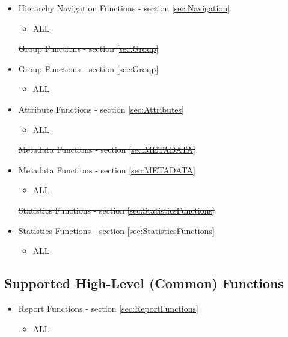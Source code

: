 \documentclass[12pt]{report} %
\providecommand{\DIFdeltex}[1]{{\protect\color{red}\sout{#1}}}                      %
\providecommand{\DIFaddbegin}{} %
\providecommand{\DIFaddend}{} %
\providecommand{\DIFdelbegin}{} %
\providecommand{\DIFdelend}{} %
\providecommand{\DIFdel}[1]{\texorpdfstring{\DIFdeltex{#1}}{}} %
\newcommand{\DIFscaledelfig}{0.5}
\newlength{\DIFdelgraphicswidth} %
\newlength{\DIFdelgraphicsheight} %
\newcommand{\DIFaddincludegraphics}[2][]{{\color{blue}\fbox{\DIFOincludegraphics[#1]{#2}}}} %
\newcommand{\DIFdelincludegraphics}[2][]{%
\sbox{\DIFdelgraphicsbox}{\DIFOincludegraphics[#1]{#2}}%
\settoboxwidth{\DIFdelgraphicswidth}{\DIFdelgraphicsbox} %
\settoboxtotalheight{\DIFdelgraphicsheight}{\DIFdelgraphicsbox} %
\scalebox{\DIFscaledelfig}{%
\parbox[b]{\DIFdelgraphicswidth}{\usebox{\DIFdelgraphicsbox}\\[-\baselineskip] \rule{\DIFdelgraphicswidth}{0em}}\llap{\resizebox{\DIFdelgraphicswidth}{\DIFdelgraphicsheight}{%
\setlength{\unitlength}{\DIFdelgraphicswidth}%
\begin{picture}(1,1)%
\thicklines\linethickness{2pt} %
{\color[rgb]{1,0,0}\put(0,0){\framebox(1,1){}}}%
{\color[rgb]{1,0,0}\put(0,0){\line( 1,1){1}}}%
{\color[rgb]{1,0,0}\put(0,1){\line(1,-1){1}}}%
\end{picture}%
}\hspace*{3pt}}} %
} %
\DeclareRobustCommand{\DIFaddbegin}{\DIFOaddbegin \let\includegraphics\DIFaddincludegraphics} %
\DeclareRobustCommand{\DIFaddend}{\DIFOaddend \let\includegraphics\DIFOincludegraphics} %
\DeclareRobustCommand{\DIFdelbegin}{\DIFOdelbegin \let\includegraphics\DIFdelincludegraphics} %
\DeclareRobustCommand{\DIFdelend}{\DIFOaddend \let\includegraphics\DIFOincludegraphics} %
\begin{document}
\begin{itemize}[noitemsep,nolistsep] 
	\item{Hierarchy Navigation Functions - section \ref{sec:Navigation}}
		\begin{itemize}[noitemsep,nolistsep] 
			\item{ALL}
		\end{itemize}
	\DIFdelbegin %
\DIFdel{Group Functions - section \ref{sec:Group}
	}\DIFdelend \DIFaddbegin \item{Group Functions - section \ref{sec:Group}}
		\DIFaddend \begin{itemize}[noitemsep,nolistsep] 
			\item{ALL}
		\end{itemize}
	\item{Attribute Functions - section \ref{sec:Attributes}}
		\begin{itemize}[noitemsep,nolistsep] 
			\item{ALL}
		\end{itemize}
	\DIFdelbegin %
\DIFdel{Metadata Functions - section \ref{sec:METADATA}
	}\DIFdelend \DIFaddbegin \item{Metadata Functions - section \ref{sec:METADATA}}
		\DIFaddend \begin{itemize}[noitemsep,nolistsep] 
			\item{ALL}
		\end{itemize}
	\DIFdelbegin %
\DIFdel{Statistics Functions - section \ref{sec:StatisticsFunctions}
	}\DIFdelend \DIFaddbegin \item{Statistics Functions - section \ref{sec:StatisticsFunctions}}
		\DIFaddend \begin{itemize}[noitemsep,nolistsep] 
			\item{ALL}
		\end{itemize}
\end{itemize}


\subsection{Supported High-Level (Common) Functions}\label{sec:AccMCHighLevel}

\begin{itemize}[noitemsep,nolistsep] 
	\DIFdelbegin %
\DIFdel{- section \ref{sec:ReportFunctions}
}\DIFdelend \DIFaddbegin \item{Report Functions - section \ref{sec:ReportFunctions}}
	\DIFaddend \begin{itemize}[noitemsep,nolistsep] 
		\item{ALL}
	\end{itemize}
\end{itemize}
\end{document}
